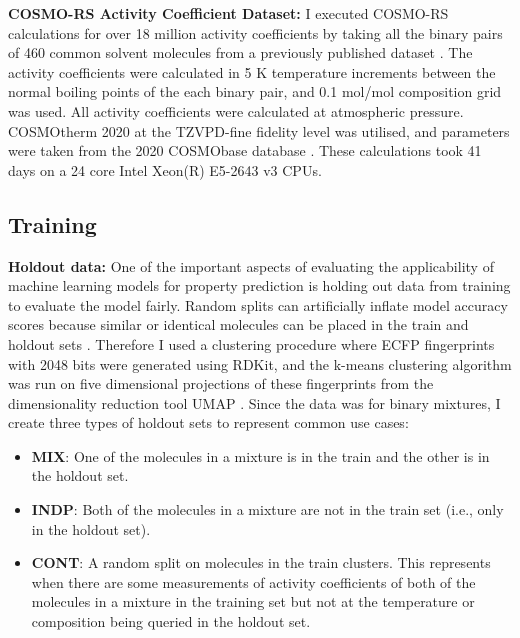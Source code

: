 \noindent
\textbf{COSMO-RS Activity Coefficient Dataset:} I executed COSMO-RS calculations for over 18 million activity coefficients by taking all the binary pairs of 460 common solvent molecules from a previously published dataset \cite{Amar2019}. The activity coefficients were calculated in 5 K temperature increments between the normal boiling points of the each binary pair, and 0.1 mol/mol composition grid was used. All activity coefficients were calculated at atmospheric pressure. COSMOtherm 2020 at the TZVPD-fine fidelity level was utilised, and parameters were taken from the 2020 COSMObase database \cite{Klamt2010}. These calculations took 41 days on a 24 core Intel Xeon(R) E5-2643 v3 CPUs. 


\subsection{Training}
\noindent
\textbf{Holdout data:} One of the important aspects of evaluating the applicability of machine learning models for property prediction is holding out data from training to evaluate the model fairly. Random splits can artificially inflate model accuracy scores because similar or identical molecules can be placed in the train and holdout sets \cite{Kovacs2021}. Therefore I used a clustering procedure where  ECFP fingerprints with 2048 bits were generated using RDKit, and the k-means clustering algorithm \cite{MacQueen1967} was run on five dimensional projections of these fingerprints from the dimensionality reduction tool UMAP \cite{McInnes2018}. Since the data was for binary mixtures, I create three types of holdout sets to represent common use cases:

\begin{itemize}
    \item \textbf{MIX}: One of the molecules in a mixture is in the train and the other is in the holdout set.
    \item \textbf{INDP}: Both of the molecules in a mixture are not in the train set (i.e., only in the holdout set).
    \item \textbf{CONT}: A random split on molecules in the train clusters. This represents when there are some measurements of activity coefficients of both of the molecules in a mixture in the training set but not at the temperature or composition being queried in the holdout set. 
\end{itemize}

